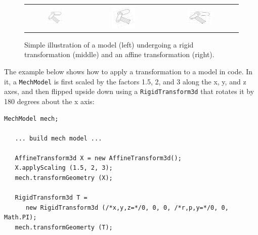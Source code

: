 \begin{figure}[ht]
\begin{center}
   \begin{tabular}{ccc}
   \includegraphics[width=0.27\textwidth]{images/tgenModel} &
   \includegraphics[width=0.34\textwidth]{images/tgenModelRigid} &
   \includegraphics[width=0.34\textwidth]{images/tgenModelAffine}
   \end{tabular}
\end{center}
\caption{Simple illustration of a model (left) undergoing a rigid
transformation (middle) and an affine transformation (right).}
\label{RigidAndAffineTransforms:fig}
\end{figure}

The example below shows how to apply a transformation to a model in
code. In it, a {\tt MechModel} is first scaled by the factors 1.5, 2,
and 3 along the x, y, and z axes, and then flipped upside down using a
{\tt RigidTransform3d} that rotates it by 180 degrees about the x
axis:
%
\begin{lstlisting}[]
   MechModel mech;

   ... build mech model ...

   AffineTransform3d X = new AffineTransform3d();
   X.applyScaling (1.5, 2, 3);
   mech.transformGeometry (X);
   
   RigidTransform3d T = 
      new RigidTransform3d (/*x,y,z=*/0, 0, 0, /*r,p,y=*/0, 0, Math.PI);
   mech.transformGeomerty (T);
\end{lstlisting}
%


